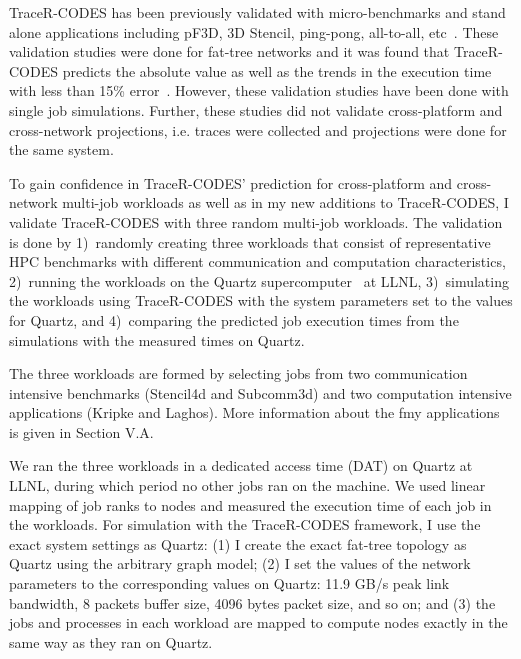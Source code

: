 
TraceR-CODES has been previously validated with micro-benchmarks and stand alone
applications including pF3D, 3D Stencil, ping-pong, all-to-all,
etc~\cite{Jain:sc2017}. These validation studies were done for fat-tree networks
and it was found that TraceR-CODES predicts the absolute value as well as the
trends in the execution time with less than 15\%
error~\cite{Jain:sc2017,acun:padabs2015}.  However, these validation studies 
have been done with single job simulations. Further, these studies did not
validate cross-platform and cross-network projections, i.e. traces were
collected and projections were done for the same system.

To gain confidence in TraceR-CODES' prediction for cross-platform and
cross-network multi-job workloads as well
as in my new additions to TraceR-CODES, I validate TraceR-CODES with three random
multi-job workloads.
The validation is done by 1)~randomly creating three workloads that consist of 
representative HPC benchmarks with different communication and computation
characteristics, 2)~running the workloads on the Quartz supercomputer~\cite{quartz} at LLNL,
3)~simulating the workloads using TraceR-CODES with the system parameters
set to the values for Quartz, and 4)~comparing the predicted job execution
times from the simulations with the measured times on Quartz. 

The three workloads are formed by selecting jobs from two communication intensive
benchmarks (Stencil4d and Subcomm3d) and two computation intensive applications
(Kripke and Laghos). More information about the fmy applications is given in
Section V.A. 

We ran the three workloads in a dedicated access time (DAT) on Quartz at LLNL, during which period
no other jobs ran on the machine. We used linear mapping of job
ranks to nodes and measured the execution time of each job in the workloads.
For simulation with the TraceR-CODES framework, I use the
exact system settings as Quartz: (1) I create
the exact fat-tree topology as Quartz using the arbitrary graph model; (2)
I set the values of the network parameters to the corresponding values on Quartz:
11.9 GB/s peak link bandwidth, 8 packets buffer size, 4096 bytes packet size,
and so on; and (3) the jobs and processes in each workload
are mapped to compute nodes exactly in the same
way as they ran on Quartz. 

